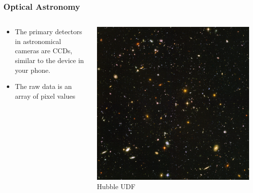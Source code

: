 \documentclass{beamer}
\begin{document}
\frame
{

    \frametitle{Optical Astronomy}


    \begin{columns}
        \begin{column}{0.5\textwidth}
            \begin{itemize}

                \item The primary detectors in astronomical cameras are CCDs,
                    similar to the device in your phone.
                    
                \item The raw data is an array of pixel values



            \end{itemize}
        \end{column}
        \begin{column}{0.5\textwidth}
            \begin{center}
                \includegraphics[width=\textwidth]{UDF_half.jpg}
                \newline
                {\tiny Hubble UDF}
            \end{center}

            
        \end{column}
    \end{columns}


}
\end{document}
